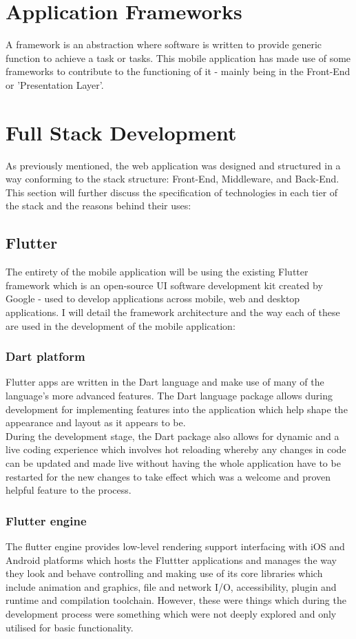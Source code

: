 \documentclass[oneside]{report}
\begin{document}
	\section{Application Frameworks}
A framework is an abstraction where software is written to provide generic function to achieve a task or tasks. This mobile application has made use of some frameworks to contribute to the functioning of it - mainly being in the Front-End or 'Presentation Layer'.

	\section{Full Stack Development}
As previously mentioned, the web application was designed and structured in a way conforming to the stack structure: Front-End, Middleware, and Back-End. This section will further discuss the specification of technologies in each tier of the stack and the reasons behind their uses: 

		\subsection{Flutter}
The entirety of the mobile application will be using the existing Flutter framework which is an open-source UI software development kit created by Google - used to develop applications across mobile, web and desktop applications. I will detail the framework architecture and the way each of these are used in the development of the mobile application: 

		\subsubsection{Dart platform}
Flutter apps are written in the Dart language and make use of many of the language's more advanced features. The Dart language package allows during development for implementing features into the application which help shape the appearance and layout as it appears to be.\\

During the development stage, the Dart package also allows for dynamic and a live coding experience which involves hot reloading whereby any changes in code can be updated and made live without having the whole application have to be restarted for the new changes to take effect which was a welcome and proven helpful feature to the process.

		\subsubsection{Flutter engine}
The flutter engine provides low-level rendering support interfacing with iOS and Android platforms which hosts the Fluttter applications and manages the way they look and behave controlling and making use of its core libraries which include animation and graphics, file and network I/O, accessibility, plugin and runtime and compilation toolchain. However, these were things which during the development process were something which were not deeply explored and only utilised for basic functionality.\\
\end{document}
